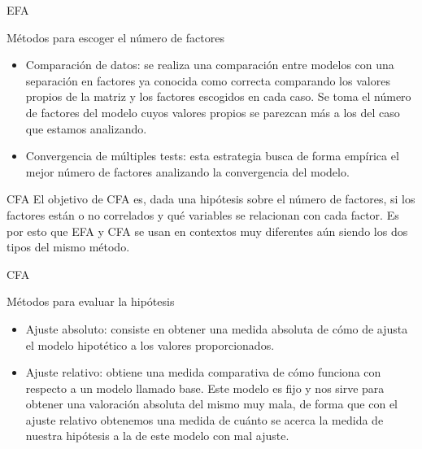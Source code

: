 \documentclass[10pt]{beamer}
\begin{document}
\begin{frame}[fragile]{EFA}
\vspace{10px}
\begin{block}{Métodos para escoger el número de factores}
	\begin{itemize}
		\item Comparación de datos: se realiza una comparación entre modelos con una separación en factores ya conocida como correcta comparando los valores propios de la matriz y los factores escogidos en cada caso. Se toma el número de factores del modelo cuyos valores propios se parezcan más a los del caso que estamos analizando.
		\item Convergencia de múltiples tests: esta estrategia busca de forma empírica el mejor número de factores analizando la convergencia del modelo.
	\end{itemize}
\end{block}
\end{frame}

\begin{frame}[fragile]{CFA}
	El objetivo de CFA es, dada una hipótesis sobre el número de factores, si los factores están o no correlados y qué variables se relacionan con cada factor. Es por esto que EFA y CFA se usan en contextos muy diferentes aún siendo los dos tipos del mismo método.
\end{frame}

\begin{frame}[fragile]{CFA}
\vspace{10px}
\begin{block}{Métodos para evaluar la hipótesis}
	\begin{itemize}
		\item Ajuste absoluto: consiste en obtener una medida absoluta de cómo de ajusta el modelo hipotético a los valores proporcionados.
		\item Ajuste relativo: obtiene una medida comparativa de cómo funciona con respecto a un modelo llamado base. Este modelo es fijo y nos sirve para obtener una valoración absoluta del mismo muy mala, de forma que con el ajuste relativo obtenemos una medida de cuánto se acerca la medida de nuestra hipótesis a la de este modelo con mal ajuste.
	\end{itemize}
\end{block}
\end{frame}
\end{document}
